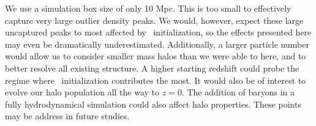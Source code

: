 We use a simulation box size of only 10 Mpc.  This is too small to effectively capture very large outlier density peaks.  We would, however, expect these large uncaptured peaks to most affected by \lpt\ initialization, so the effects presented here may even be dramatically underestimated.  Additionally, a larger particle number would allow us to consider smaller mass halos than we were able to here, and to better resolve all existing structure.  A higher starting redshift could probe the regime where \lpt\ initialization contributes the most.  It would also be of interest to evolve our halo population all the way to $z = 0$.  The addition of baryons in a fully hydrodynamical simulation could also affect halo properties.  These points may be address in future studies.
